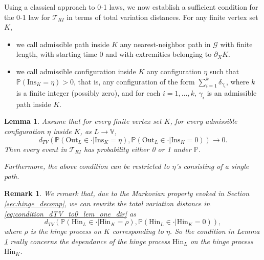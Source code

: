 \documentclass[12pt,a4paper]{article}
\newtheorem{lemma}[theo]{Lemma}
\newtheorem{remark}[theo]{Remark}
\newcommand{\1}[1]{{\mathbf 1}{\{#1\}}}
\newcommand{\8}{{\infty}}
\newcommand{\p}{\mathbb{P}}
\newcommand{\Out}{\mathrm{Out}}
\newcommand{\In}{\mathrm{Ins}}
\newcommand{\Hin}{\mathrm{Hin}}
\begin{document}
\medskip
Using a classical approach to 0-1 laws, we now establish a sufficient condition for the 0-1 law for $\mathcal{T}_{RI}$ in terms of total variation distances. 
For any finite vertex set $K$, 
\begin{itemize}
\item we call admissible path inside $K$ any nearest-neighbor path in $\mathcal{G}$ with finite length, with starting time 0 and with extremities belonging to $\partial_X K$.
\item we call admissible configuration inside $K$ any configuration $\eta$ such that $\p(\In_K=\eta)>0$, that is, any configuration of the form $\sum_{i=1}^k \delta_{\gamma_i}$, where $k$ is a finite integer (possibly zero), and for each $i=1, \dots, k$, $\gamma_i$ is an admissible path inside $K$. 
\end{itemize}


\begin{lemma}  \label{lem:suf_cond_0_1_law_distance}
  Assume that for every finite vertex set $K$, for every admissible configuration $\eta$ inside $K$, as $L\to \mathbb{V}$,
  \begin{equation}\label{eq:condition_dTV_to0_lem_one_dir}
    d_{TV}\left(\mathbb{P}(\Out_L  \in \cdot | \In_K =\eta),
    \mathbb{P}(\Out_L  \in \cdot | \In_K =0) \right) \to 0.
  \end{equation}
  Then every event in $\mathcal{T}_{RI}$ has probability either 0 or 1 under $\p$.

  Furthermore, the above condition can be restricted to $\eta$'s consisting of a single path.
\end{lemma}
\begin{remark}\label{rem:rewrite_d_TV_cond}
We remark that, due to the Markovian property evoked in Section \ref{sec:hinge_decomp}, we can rewrite the total variation distance in \eqref{eq:condition_dTV_to0_lem_one_dir} as
\begin{equation}
   d_{TV}\left(\mathbb{P}( \Hin_L  \in \cdot | \Hin_K =\rho),
    \mathbb{P}(\Hin_L  \in \cdot | \Hin_K =0) \right),
\end{equation}
  where $\rho$ is the hinge process on $K$ corresponding to $\eta$. 
  So the condition in Lemma \ref{lem:suf_cond_0_1_law_distance} really concerns the dependance of the hinge process $\Hin_L$ on the hinge process $\Hin_K$. 
\end{remark}
\end{document}
